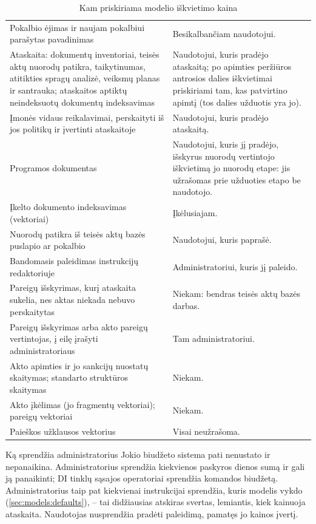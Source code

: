\begin{table}[H]
\caption{Kam priskiriama modelio iškvietimo kaina}\label{tab:models:charged}
\begin{tabularx}{\textwidth}{@{}L{62mm}Y@{}}
\toprule
{} &  \\
\midrule
Pokalbio ėjimas ir naujam pokalbiui parašytas pavadinimas & Besikalbančiam naudotojui. \\
Ataskaita: dokumentų inventoriai, teisės aktų nuorodų patikra, taikytinumas, atitikties spragų analizė, veiksmų planas ir santrauka; ataskaitos aptiktų neindeksuotų dokumentų indeksavimas & Naudotojui, kuris pradėjo ataskaitą; po apimties peržiūros antrosios dalies iškvietimai priskiriami tam, kas patvirtino apimtį (tos dalies užduotis yra jo). \\
Įmonės vidaus reikalavimai, perskaityti iš jos politikų ir įvertinti ataskaitoje & Naudotojui, kuris pradėjo ataskaitą. \\
Programos dokumentas & Naudotojui, kuris jį pradėjo, išskyrus nuorodų vertintojo iškvietimą jo nuorodų etape: jis užrašomas prie užduoties etapo be naudotojo. \\
Įkelto dokumento indeksavimas (vektoriai) & Įkėlusiajam. \\
Nuorodų patikra iš teisės aktų bazės puslapio ar pokalbio & Naudotojui, kuris paprašė. \\
Bandomasis paleidimas instrukcijų redaktoriuje & Administratoriui, kuris jį paleido. \\
Pareigų išskyrimas, kurį ataskaita sukelia, nes aktas niekada nebuvo perskaitytas & Niekam: bendras teisės aktų bazės darbas. \\
Pareigų išskyrimas arba akto pareigų vertintojas, į eilę įrašyti administratoriaus & Tam administratoriui. \\
Akto apimties ir jo sankcijų nuostatų skaitymas; standarto struktūros skaitymas & Niekam. \\
Akto įkėlimas (jo fragmentų vektoriai); pareigų vektoriai & Niekam. \\
Paieškos užklausos vektorius & Visai neužrašoma. \\
\bottomrule
\end{tabularx}
\end{table}

\begin{humanbox}{Ką sprendžia administratorius}
Jokio biudžeto sistema pati nenustato ir nepanaikina. Administratorius sprendžia kiekvienos
paskyros dienos sumą ir gali ją panaikinti; DI tinklų sąsajos operatoriai sprendžia komandos
biudžetą. Administratorius taip pat kiekvienai instrukcijai sprendžia, kuris modelis vykdo
(\cref{sec:models:defaults}), -- tai didžiausias atskiras svertas, lemiantis, kiek kainuoja
ataskaita. Naudotojas nusprendžia pradėti paleidimą, pamatęs jo kainos įvertį.
\end{humanbox}


